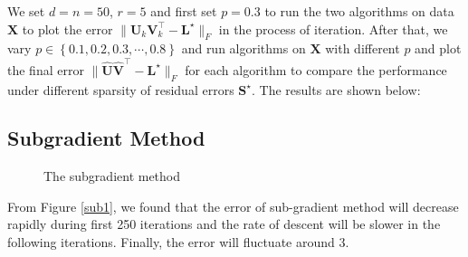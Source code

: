 \documentclass[conference]{IEEEtran}
\begin{document}
We set $d=n=50$, $r=5$ and first set $p=0.3$ to run the two algorithms on data $\boldsymbol{X}$ to plot the error $\|\boldsymbol{U}_k\boldsymbol{V}_k^{\top}-\boldsymbol{L}^{\star}\|_F$ in the process of iteration. After that, we vary $p\in\left\{0.1,0.2,0.3,\cdots,0.8\right\}$ and run algorithms on $\boldsymbol{X}$ with different $p$ and plot the final error $\|\widehat{\boldsymbol{U}}\widehat{\boldsymbol{V}}^{\top}-\boldsymbol{L}^{\star}\|_F$ for each algorithm to compare the performance under different sparsity of residual errors $\boldsymbol{S}^{\star}$. The results are shown below:

\subsection{Subgradient Method}
\begin{figure}[htbp]
  \centering
  \quad
  \caption{The subgradient method}
  \label{sub}
\end{figure}

From Figure \ref{sub1}, we found that the error of sub-gradient method will decrease rapidly during first 250 iterations and the rate of descent will be slower in the following iterations. Finally, the error will fluctuate around 3.
\end{document}
